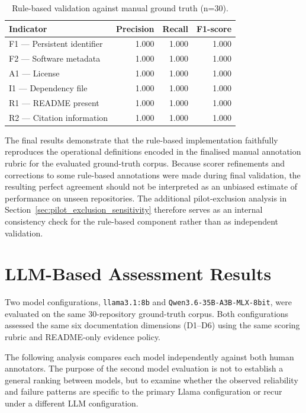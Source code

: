 \begin{table}[h]
\centering
\caption{Rule-based validation against manual ground truth (n=30).}
\label{tab:rule_prf}
\begin{tabular}{lrrr}
\hline
\textbf{Indicator} & \textbf{Precision} & \textbf{Recall} &
\textbf{F1-score} \\
\hline
F1 --- Persistent identifier & 1.000 & 1.000 & 1.000 \\
F2 --- Software metadata     & 1.000 & 1.000 & 1.000 \\
A1 --- License               & 1.000 & 1.000 & 1.000 \\
I1 --- Dependency file       & 1.000 & 1.000 & 1.000 \\
R1 --- README present        & 1.000 & 1.000 & 1.000 \\
R2 --- Citation information  & 1.000 & 1.000 & 1.000 \\
\hline
\end{tabular}
\end{table}

The final results demonstrate that the rule-based implementation
faithfully reproduces the operational definitions encoded in the
finalised manual annotation rubric for the evaluated ground-truth
corpus. Because scorer refinements and corrections to some rule-based
annotations were made during final validation, the resulting perfect
agreement should not be interpreted as an unbiased estimate of
performance on unseen repositories. The additional pilot-exclusion
analysis in Section~\ref{sec:pilot_exclusion_sensitivity} therefore
serves as an internal consistency check for the rule-based component 
rather than as independent validation.
\section{LLM-Based Assessment Results}
Two model configurations, \texttt{llama3.1:8b} and
\texttt{Qwen3.6-35B-A3B-MLX-8bit}, were evaluated on the same
30-repository ground-truth corpus. Both configurations assessed
the same six documentation dimensions (D1--D6) using the same scoring
rubric and README-only evidence policy.

The following analysis compares each model independently against both
human annotators. The purpose of the second model evaluation is not to
establish a general ranking between models, but to examine whether the
observed reliability and failure patterns are specific to the primary
Llama configuration or recur under a different LLM configuration.

